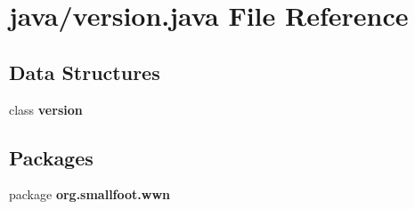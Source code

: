 \section{java/version.java File Reference}
\label{version_8java}
\subsection*{Data Structures}
\begin{DoxyCompactItemize}
\item 
class {\bf version}
\end{DoxyCompactItemize}
\subsection*{Packages}
\begin{DoxyCompactItemize}
\item 
package {\bf org.\-smallfoot.\-wwn}
\end{DoxyCompactItemize}
